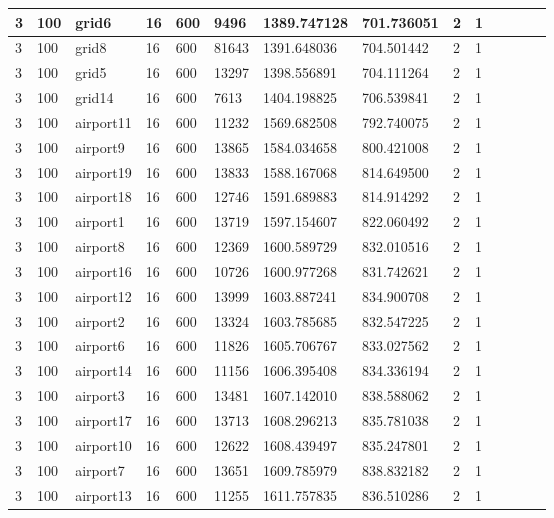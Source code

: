 \documentclass[../thesis.tex]{subfiles}
\begin{document}
\begin{table}[!ht]
\begin{tabularx}{\textwidth}{|X|X|X|X|X|X|X|X|X|X|X|X|X|X|}
        3 & 100 & grid6 & 16 & 600 & 9496 & 1389.747128 & 701.736051 & 2 & 1 \\ \hline
        3 & 100 & grid8 & 16 & 600 & 81643 & 1391.648036 & 704.501442 & 2 & 1 \\ \hline
        3 & 100 & grid5 & 16 & 600 & 13297 & 1398.556891 & 704.111264 & 2 & 1 \\ \hline
        3 & 100 & grid14 & 16 & 600 & 7613 & 1404.198825 & 706.539841 & 2 & 1 \\ \hline
        3 & 100 & airport11 & 16 & 600 & 11232 & 1569.682508 & 792.740075 & 2 & 1 \\ \hline
        3 & 100 & airport9 & 16 & 600 & 13865 & 1584.034658 & 800.421008 & 2 & 1 \\ \hline
        3 & 100 & airport19 & 16 & 600 & 13833 & 1588.167068 & 814.649500 & 2 & 1 \\ \hline
        3 & 100 & airport18 & 16 & 600 & 12746 & 1591.689883 & 814.914292 & 2 & 1 \\ \hline
        3 & 100 & airport1 & 16 & 600 & 13719 & 1597.154607 & 822.060492 & 2 & 1 \\ \hline
        3 & 100 & airport8 & 16 & 600 & 12369 & 1600.589729 & 832.010516 & 2 & 1 \\ \hline
        3 & 100 & airport16 & 16 & 600 & 10726 & 1600.977268 & 831.742621 & 2 & 1 \\ \hline
        3 & 100 & airport12 & 16 & 600 & 13999 & 1603.887241 & 834.900708 & 2 & 1 \\ \hline
        3 & 100 & airport2 & 16 & 600 & 13324 & 1603.785685 & 832.547225 & 2 & 1 \\ \hline
        3 & 100 & airport6 & 16 & 600 & 11826 & 1605.706767 & 833.027562 & 2 & 1 \\ \hline
        3 & 100 & airport14 & 16 & 600 & 11156 & 1606.395408 & 834.336194 & 2 & 1 \\ \hline
        3 & 100 & airport3 & 16 & 600 & 13481 & 1607.142010 & 838.588062 & 2 & 1 \\ \hline
        3 & 100 & airport17 & 16 & 600 & 13713 & 1608.296213 & 835.781038 & 2 & 1 \\ \hline
        3 & 100 & airport10 & 16 & 600 & 12622 & 1608.439497 & 835.247801 & 2 & 1 \\ \hline
        3 & 100 & airport7 & 16 & 600 & 13651 & 1609.785979 & 838.832182 & 2 & 1 \\ \hline
        3 & 100 & airport13 & 16 & 600 & 11255 & 1611.757835 & 836.510286 & 2 & 1 \\ \hline

\end{tabularx}
\end{table}
\end{document}
